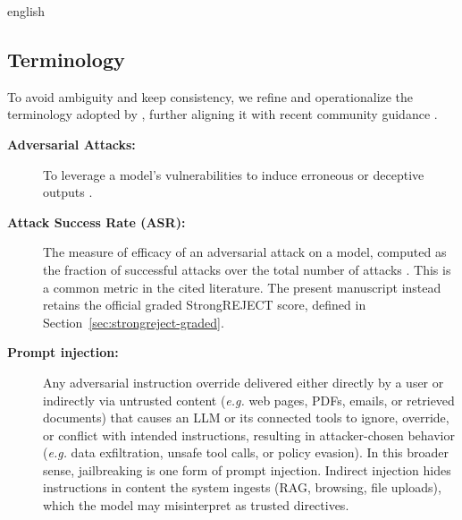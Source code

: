 \begin{otherlanguage*}{english}
\begin{figure}[ht!]
\begin{tikzpicture}[
   level distance=2.5cm,
   level 1/.style={sibling distance=55mm},
   edge from parent/.style={->,draw},
   >=latex
]
\end{tikzpicture}
\end{figure}

\subsection{Terminology}

To avoid ambiguity and keep consistency, we refine and operationalize the terminology adopted by \textcite{abdaliSecuringLargeLanguage2024a}, further aligning it with recent community guidance \cite{owasp_top_10_llm}.

\begin{description}

  \item[\textbf{Adversarial Attacks:}] To leverage a model's vulnerabilities to induce erroneous or deceptive outputs \cite{bachuLayerwiseAlignmentExamining2025, shayeganiSurveyVulnerabilitiesLarge2023}.

  \item[\textbf{Attack Success Rate (ASR):}] The measure of efficacy of an adversarial attack on a model, computed as the fraction of successful attacks over the total number of attacks \cite{wuPerformanceEvaluationAdversarial2021}. This is a common metric in the cited literature. The present manuscript instead retains the official graded StrongREJECT score, defined in Section~\ref{sec:strongreject-graded}.

  \item[\textbf{Prompt injection:}] Any adversarial instruction override delivered either directly by a user or indirectly via untrusted content (\textit{e.g.} web pages, PDFs, emails, or retrieved documents) that causes an LLM or its connected tools to ignore, override, or conflict with intended instructions, resulting in attacker-chosen behavior (\textit{e.g.} data exfiltration, unsafe tool calls, or policy evasion). In this broader sense, jailbreaking is one form of prompt injection. Indirect injection hides instructions in content the system ingests (RAG, browsing, file uploads), which the model may misinterpret as trusted directives.
  

\end{description}
\end{otherlanguage*}
